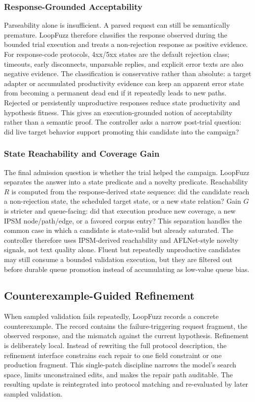 \documentclass[final,5p,times,number]{elsarticle}
\begin{document}
\subsubsection{Response-Grounded Acceptability}
Parseability alone is insufficient. A parsed request can still be semantically premature. LoopFuzz therefore classifies the response observed during the bounded trial execution and treats a non-rejection response as positive evidence. For response-code protocols, 4xx/5xx states are the default rejection class; timeouts, early disconnects, unparsable replies, and explicit error texts are also negative evidence. The classification is conservative rather than absolute: a target adapter or accumulated productivity evidence can keep an apparent error state from becoming a permanent dead end if it repeatedly leads to new paths. Rejected or persistently unproductive responses reduce state productivity and hypothesis fitness. This gives an execution-grounded notion of acceptability rather than a semantic proof. The controller asks a narrow post-trial question: did live target behavior support promoting this candidate into the campaign?

\subsubsection{State Reachability and Coverage Gain}
The final admission question is whether the trial helped the campaign. LoopFuzz separates the answer into a state predicate and a novelty predicate. Reachability $R$ is computed from the response-derived state sequence: did the candidate reach a non-rejection state, the scheduled target state, or a new state relation? Gain $G$ is stricter and queue-facing: did that execution produce new coverage, a new IPSM node/path/edge, or a favored corpus entry? This separation handles the common case in which a candidate is state-valid but already saturated. The controller therefore uses IPSM-derived reachability and AFLNet-style novelty signals, not text quality alone. Fluent but repeatedly unproductive candidates may still consume a bounded validation execution, but they are filtered out before durable queue promotion instead of accumulating as low-value queue bias.

\subsection{Counterexample-Guided Refinement}
When sampled validation fails repeatedly, LoopFuzz records a concrete counterexample. The record contains the failure-triggering request fragment, the observed response, and the mismatch against the current hypothesis. Refinement is deliberately local. Instead of rewriting the full protocol description, the refinement interface constrains each repair to one field constraint or one production fragment. This single-patch discipline narrows the model's search space, limits unconstrained edits, and makes the repair path auditable. The resulting update is reintegrated into protocol matching and re-evaluated by later sampled validation.
\end{document}
